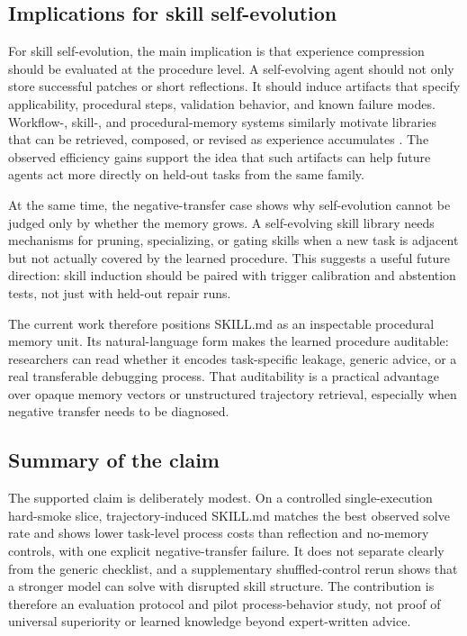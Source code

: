 \subsection{Implications for skill self-evolution}
\label{sec:discussion_self_evolution}

For skill self-evolution, the main implication is that experience compression should be evaluated at the procedure level. A self-evolving agent should not only store successful patches or short reflections. It should induce artifacts that specify applicability, procedural steps, validation behavior, and known failure modes. Workflow-, skill-, and procedural-memory systems similarly motivate libraries that can be retrieved, composed, or revised as experience accumulates \cite{wang2025workflowmemory,zheng2025skillweaver,fang2026memp,mi2026skillpro}. The observed efficiency gains support the idea that such artifacts can help future agents act more directly on held-out tasks from the same family.

At the same time, the negative-transfer case shows why self-evolution cannot be judged only by whether the memory grows. A self-evolving skill library needs mechanisms for pruning, specializing, or gating skills when a new task is adjacent but not actually covered by the learned procedure. This suggests a useful future direction: skill induction should be paired with trigger calibration and abstention tests, not just with held-out repair runs.

The current work therefore positions SKILL.md as an inspectable procedural memory unit. Its natural-language form makes the learned procedure auditable: researchers can read whether it encodes task-specific leakage, generic advice, or a real transferable debugging process. That auditability is a practical advantage over opaque memory vectors or unstructured trajectory retrieval, especially when negative transfer needs to be diagnosed.

\subsection{Summary of the claim}
\label{sec:discussion_summary}

The supported claim is deliberately modest. On a controlled single-execution hard-smoke slice, trajectory-induced SKILL.md matches the best observed solve rate and shows lower task-level process costs than reflection and no-memory controls, with one explicit negative-transfer failure. It does not separate clearly from the generic checklist, and a supplementary shuffled-control rerun shows that a stronger model can solve with disrupted skill structure. The contribution is therefore an evaluation protocol and pilot process-behavior study, not proof of universal superiority or learned knowledge beyond expert-written advice.
